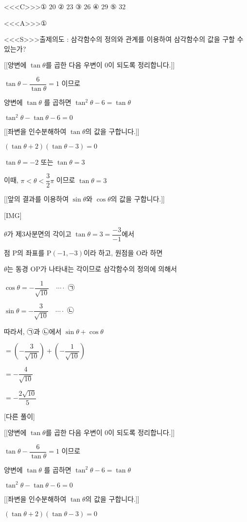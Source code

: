 \documentclass{oblivoir}
\begin{document}
<<<C>>>① $20$
② $23$
③ $26$
④ $29$
⑤ $32$

<<<A>>>①

<<<S>>>출제의도 : 삼각함수의 정의와 관계를 이용하여 삼각함수의 값을 구할 수 있는가?

[[양변에 $\tan \theta$를 곱한 다음 우변이 $0$이 되도록 정리합니다.]]

$\tan \theta-\dfrac{6}{\tan \theta}=1$ 이므로

양변에 $\tan \theta$ 를 곱하면
$\tan ^{2} \theta-6=\tan \theta$

$\tan ^{2} \theta-\tan \theta-6=0$

[[좌변을 인수분해하여 $\tan \theta$의 값을 구합니다.]]

$(\tan \theta+2)(\tan \theta-3)=0$

$\tan \theta=-2$ 또는 $\tan \theta=3$

이때, $\pi< \theta< \dfrac{3}{2} \pi$ 이므로
$\tan \theta=3$

[[앞의 결과를 이용하여 $\sin \theta$와 $\cos \theta$의 값을 구합니다.]]

[IMG]

$\theta$가 제$3$사분면의 각이고 $\tan \theta=3 = \dfrac{-3}{-1}$에서

점 $\mathrm{P}$의 좌표를 $\mathrm{P}(-1,-3)$이라 하고, 원점을 $\mathrm{O}$라 하면

$\theta$는 동경 $\mathrm{OP}$가 나타내는 각이므로 삼각함수의 정의에 의해서 

$\cos \theta=-\dfrac{1}{\sqrt{10}} \quad \cdots \cdot$ ㉠

$\sin \theta=-\dfrac{3}{\sqrt{10}} \quad \cdots \cdot$ ㉡

따라서, ㉠과 ㉡에서 $\sin \theta+\cos \theta$

$=\left(-\dfrac{3}{\sqrt{10}}\right)+\left(-\dfrac{1}{\sqrt{10}}\right)$

$=-\dfrac{4}{\sqrt{10}}$

$=-\dfrac{2 \sqrt{10}}{5}$

[다른 풀이]

[[양변에 $\tan \theta$를 곱한 다음 우변이 $0$이 되도록 정리합니다.]]

$\tan \theta-\dfrac{6}{\tan \theta}=1$ 이므로

양변에 $\tan \theta$ 를 곱하면
$\tan ^{2} \theta-6=\tan \theta$

$\tan ^{2} \theta-\tan \theta-6=0$

[[좌변을 인수분해하여 $\tan \theta$의 값을 구합니다.]]

$(\tan \theta+2)(\tan \theta-3)=0$
\end{document}
